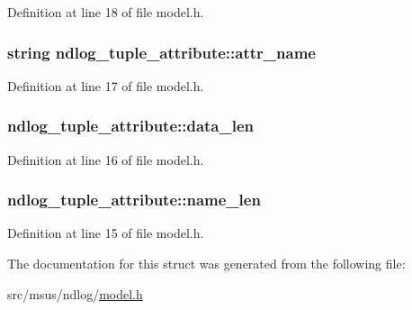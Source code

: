 Definition at line 18 of file model.\-h.

\hypertarget{structndlog__tuple__attribute_ae23fda4bfaa4c39ae7e7ffa4d88f29f0}{
\subsubsection[{attr\-\_\-name}]{\setlength{\rightskip}{0pt plus 5cm}string ndlog\-\_\-tuple\-\_\-attribute\-::attr\-\_\-name}}\label{structndlog__tuple__attribute_ae23fda4bfaa4c39ae7e7ffa4d88f29f0}


Definition at line 17 of file model.\-h.

\hypertarget{structndlog__tuple__attribute_a2f59a569d56f6d3913d1d216a7ab4e2f}{
\subsubsection[{data\-\_\-len}]{ ndlog\-\_\-tuple\-\_\-attribute\-::data\-\_\-len}}\label{structndlog__tuple__attribute_a2f59a569d56f6d3913d1d216a7ab4e2f}


Definition at line 16 of file model.\-h.

\hypertarget{structndlog__tuple__attribute_a00ae3914e780196c86e1ef9d28968c35}{
\subsubsection[{name\-\_\-len}]{ ndlog\-\_\-tuple\-\_\-attribute\-::name\-\_\-len}}\label{structndlog__tuple__attribute_a00ae3914e780196c86e1ef9d28968c35}


Definition at line 15 of file model.\-h.



The documentation for this struct was generated from the following file\-:\begin{DoxyCompactItemize}
\item 
src/msus/ndlog/\hyperlink{model_8h}{model.\-h}\end{DoxyCompactItemize}
